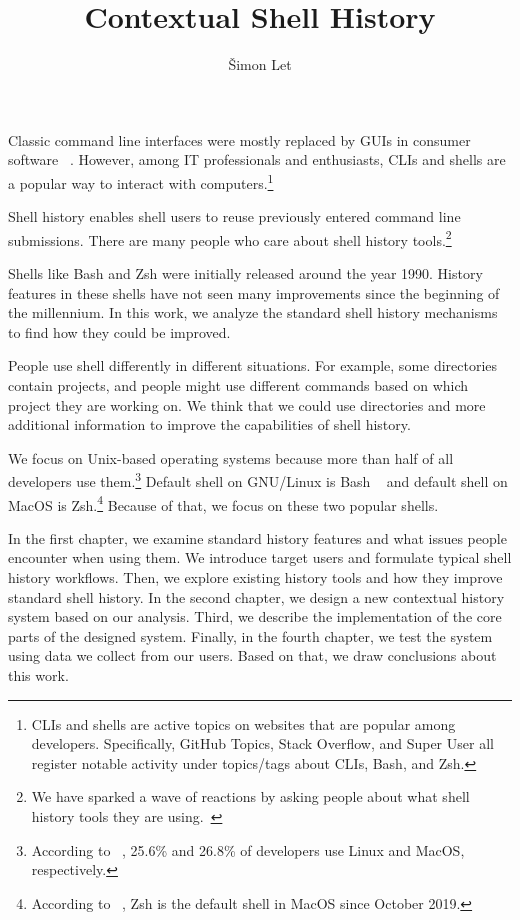 \documentclass[thesis=M,english]{FITthesis}[2012/10/20]
\title{Contextual Shell History}
\author{Šimon Let} %
\let\myCite\cite
\renewcommand\cite{\unskip~\myCite}
\begin{document}
\begin{introduction}

Classic command line interfaces were mostly replaced by GUIs in consumer software \cite{norman2007ui}. However, among IT professionals and enthusiasts, CLIs and shells are a popular way to interact with computers.\footnote{CLIs and shells are active topics on websites that are popular among developers. Specifically, GitHub Topics, Stack Overflow, and Super User all register notable activity under topics/tags about CLIs, Bash, and Zsh.} 

Shell history enables shell users to reuse previously entered command line submissions.
There are many people who care about shell history tools.\footnote{We have sparked a wave of reactions by asking people about what shell history tools they are using.\cite{twitter-thread}}

Shells like Bash and Zsh were initially released around the year 1990. History features in these shells have not seen many improvements since the beginning of the millennium. In this work, we analyze the standard shell history mechanisms to find how they could be improved.

People use shell differently in different situations. For example, some directories contain projects, and people might use different commands based on which project they are working on. We think that we could use directories and more additional information to improve the capabilities of shell history. 

We focus on Unix-based operating systems because more than half of all developers use them.\footnote{According to \cite{stackoverflow2019devsurvey}, 25.6\% and 26.8\% of developers use Linux and MacOS, respectively.} 
Default shell on GNU/Linux is Bash \cite{ramey1994gnubash} and default shell on MacOS is Zsh.\footnote{According to \cite{apple2019zsh}, Zsh is the default shell in MacOS since October 2019.} Because of that, we focus on these two popular shells.


In the first chapter, we examine standard history features and what issues people encounter when using them. We introduce target users and formulate typical shell history workflows. Then, we explore existing history tools and how they improve standard shell history. In the second chapter, we design a new contextual history system based on our analysis. Third, we describe the implementation of the core parts of the designed system. Finally, in the fourth chapter, we test the system using data we collect from our users. Based on that, we draw conclusions about this work.


\end{introduction}
\end{document}
